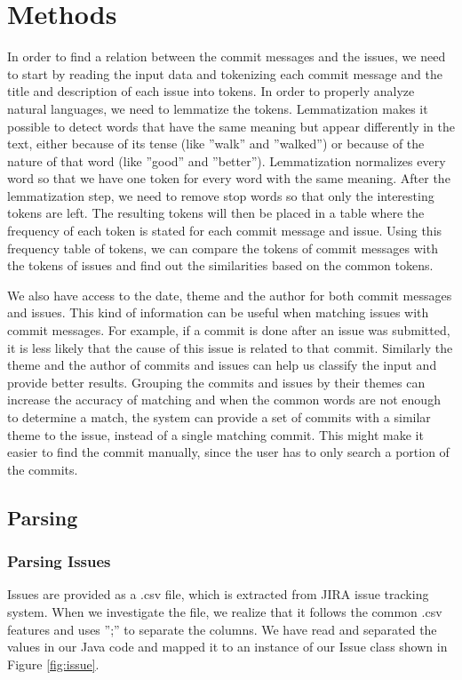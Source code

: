 \section{Methods}
\label{sec:methods}

In order to find a relation between the commit messages and the issues, we need to start by reading the input data and tokenizing each commit message and the title and description of each issue into tokens. In order to properly analyze natural languages, we need to lemmatize the tokens. Lemmatization makes it possible to detect words that have the same meaning but appear differently in the text, either because of its tense (like ''walk'' and ''walked'') or because of the nature of that word (like ''good'' and ''better''). Lemmatization normalizes every word so that we have one token for every word with the same meaning. After the lemmatization step, we need to remove stop words so that only the interesting tokens are left. The resulting tokens will then be placed in a table where the frequency of each token is stated for each commit message and issue. Using this frequency table of tokens, we can compare the tokens of commit messages with the tokens of issues and find out the similarities based on the common tokens.


We also have access to the date, theme and the author for both commit messages and issues. This kind of information can be useful when matching issues with commit messages. For example, if a commit is done after an issue was submitted, it is less likely that the cause of this issue is related to that commit. Similarly the theme and the author of commits and issues can help us classify the input and provide better results. Grouping the commits and issues by their themes can increase the accuracy of matching and when the common words are not enough to determine a match, the system can provide a set of commits with a similar theme to the issue, instead of a single matching commit. This might make it easier to find the commit manually, since the user has to only search a portion of the commits.

\subsection{Parsing}

\subsubsection{Parsing Issues}
Issues are provided as a .csv file, which is extracted from JIRA issue tracking system. When we investigate the file, we realize that it follows the common .csv features and uses '';'' to separate the columns. We have read and separated the values in our Java code and mapped it to an instance of our Issue class shown in Figure \ref{fig:issue}. 

